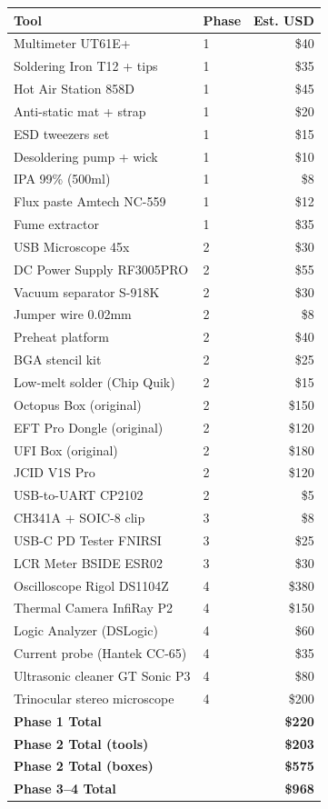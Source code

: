 \vspace{0.2cm}
\noindent
\begin{tabular}{@{}p{5.5cm} p{2.5cm} r@{}}
\toprule
\textbf{\color{arliznavy}Tool} & \textbf{\color{arligray}Phase} & \textbf{\color{arlizblue}Est. USD} \\
\midrule
Multimeter UT61E+ & 1 & \$40 \\
Soldering Iron T12 + tips & 1 & \$35 \\
Hot Air Station 858D & 1 & \$45 \\
Anti-static mat + strap & 1 & \$20 \\
ESD tweezers set & 1 & \$15 \\
Desoldering pump + wick & 1 & \$10 \\
IPA 99\% (500ml) & 1 & \$8 \\
Flux paste Amtech NC-559 & 1 & \$12 \\
Fume extractor & 1 & \$35 \\
\midrule
USB Microscope 45x & 2 & \$30 \\
DC Power Supply RF3005PRO & 2 & \$55 \\
Vacuum separator S-918K & 2 & \$30 \\
Jumper wire 0.02mm & 2 & \$8 \\
Preheat platform & 2 & \$40 \\
BGA stencil kit & 2 & \$25 \\
Low-melt solder (Chip Quik) & 2 & \$15 \\
\midrule
Octopus Box (original) & 2 & \$150 \\
EFT Pro Dongle (original) & 2 & \$120 \\
UFI Box (original) & 2 & \$180 \\
JCID V1S Pro & 2 & \$120 \\
USB-to-UART CP2102 & 2 & \$5 \\
\midrule
CH341A + SOIC-8 clip & 3 & \$8 \\
USB-C PD Tester FNIRSI & 3 & \$25 \\
LCR Meter BSIDE ESR02 & 3 & \$30 \\
\midrule
Oscilloscope Rigol DS1104Z & 4 & \$380 \\
Thermal Camera InfiRay P2 & 4 & \$150 \\
Logic Analyzer (DSLogic) & 4 & \$60 \\
Current probe (Hantek CC-65) & 4 & \$35 \\
\midrule
Ultrasonic cleaner GT Sonic P3 & 4 & \$80 \\
Trinocular stereo microscope & 4 & \$200 \\
\midrule
\textbf{Phase 1 Total} & & \textbf{\$220} \\
\textbf{Phase 2 Total (tools)} & & \textbf{\$203} \\
\textbf{Phase 2 Total (boxes)} & & \textbf{\$575} \\
\textbf{Phase 3--4 Total} & & \textbf{\$968} \\
\bottomrule
\end{tabular}

